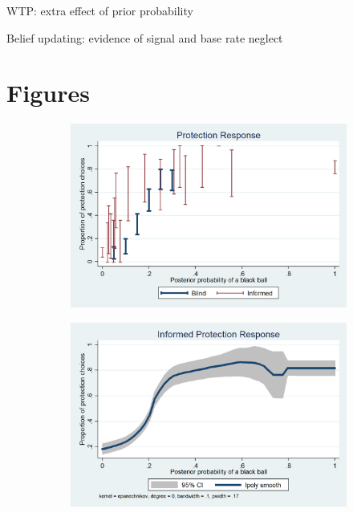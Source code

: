 \documentclass[12pt,a4paper]{article}
\begin{document}
\begin{table} \label{table_extra_prob}
\caption{WTP: extra effect of prior probability}

\end{table}


%
%
\begin{table} 
\caption{Belief updating: evidence of signal and base rate neglect} \label{updating_tab}

\end{table}

 \label{ip_tab}

\newpage
\section{Figures}

\begin{figure}[H]
\centering
\caption{Average Protection Response} \label{Prot_Response_Fig}
\begin{subfigure}[t]{.48\textwidth}
  \centering
  \includegraphics[width=\textwidth]{Graphs/ip_response_comp.png}
\end{subfigure}
\begin{subfigure}[t]{.48\textwidth}
  \centering
  \includegraphics[width=\textwidth]{Graphs/ip_response_lpoly.png}

\end{subfigure}
\end{figure}
\end{document}
